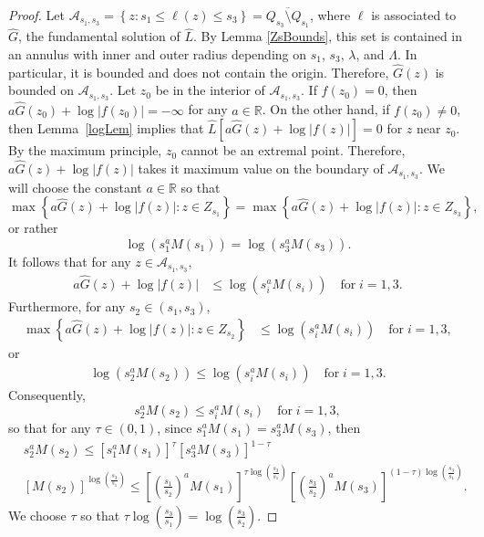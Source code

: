 \documentclass[12pt,reqno]{amsart}
\theoremstyle{plain}
\theoremstyle{definition}
\newcommand{\la}{\lambda}
\newcommand{\La}{\Lambda}
\newcommand{\abs}[1]{\left\vert#1\right\vert}
\newcommand{\set}[1]{\left\{#1\right\}}
\newcommand{\brac}[1]{\left[#1\right]}
\newcommand{\pr}[1]{\left( #1 \right) }
\newcommand{\R}{\ensuremath{\mathbb{R}}}
\begin{document}
\begin{proof}
Let $\mathcal{A}_{s_1, s_3} = \set{z : s_1 \le \ell\pr{ z} \le s_3} = \overline{ Q_{s_3} \setminus Q_{s_1}}$, where $\ell$ is associated to $\hat G$, the fundamental solution of $\hat L$.  
By Lemma \ref{ZsBounds}, this set is contained in an annulus with inner and outer radius depending on $s_1$, $s_3$, $\la$, and $\La$.
In particular, it is bounded and does not contain the origin.
Therefore, $\hat G\pr{z}$ is bounded on $\mathcal{A}_{s_1, s_3}$. 
Let $z_0$ be in the interior of $\mathcal{A}_{s_1,s_3}$. 
If $f\pr{z_0}=0$, then $a \hat G\pr{z_0}+\log\abs{f\pr{z_0}}=-\infty$ for any $a\in\R$. 
On the other hand, if $f\pr{z_0} \ne 0$, then Lemma~\ref{logLem} implies that $\hat L \brac{a \hat G\pr{z} + \log\abs{f\pr{z}}} = 0$ for $z$ near $z_0$. 
By the maximum principle, $z_0$ cannot be an extremal point. 
Therefore, $a \hat G\pr{z} + \log\abs{f\pr{z}}$ takes it maximum value on the boundary of $\mathcal{A}_{s_1, s_3}$. We will choose the constant $a\in\R$ so that 
$$\max\set{a \hat G\pr{z} + \log\abs{f\pr{z}} : z \in Z_{s_1}}  = \max\set{a \hat G\pr{z} + \log\abs{f\pr{z}} : z \in  Z_{s_3}},$$
or rather
$$\log \pr{s_1^a M\pr{s_1}}  = \log\pr{s_3^a M\pr{s_3}}.$$
It follows that for any $z \in \mathcal{A}_{s_1, s_3}$,
\begin{align*}
a \hat G\pr{z} + \log\abs{f\pr{z}} 
&\le\log \pr{s_i^a M\pr{s_i}}  \quad {\mbox{for}}\; i=1,3.
\end{align*}
Furthermore, for any $s_2 \in \pr{s_1, s_3}$,
\begin{align*}
\max\set{a \hat G\pr{z} + \log\abs{f\pr{z}}: z \in Z_{s_2}} 
&\le \log \pr{s_i^a M\pr{s_i}} \quad {\mbox{for}}\; i = 1,3,
\end{align*}
or
\begin{align*}
\log \pr{s_2^a M\pr{s_2}} 
\le \log \pr{s_i^a M\pr{s_i}} \quad {\mbox{for}}\; i=1,3.
\end{align*}
Consequently,
$${s_2^a M\pr{s_2}} \le 
{s_i^a M\pr{s_i}} \quad {\mbox{for}}\;i=1,3,$$
so that for any $\tau \in \pr{0,1}$, since ${s_1^a M\pr{s_1}} = {s_3^a M\pr{s_3}}$, then
\begin{align*}
&{s_2^a M\pr{s_2}} \le  \brac{s_1^a M\pr{s_1}}^\tau \brac{s_3^a M\pr{s_3}}^{1-\tau} \\
& \brac{ M\pr{s_2}}^{\log\pr{\frac{s_3}{s_1}}} \le  \brac{\pr{\frac{s_1}{s_2}}^a M\pr{s_1}}^{\tau \log\pr{\frac{s_3}{s_1}}} \brac{\pr{\frac{s_3}{s_2}}^a M\pr{s_3}}^{\pr{1-\tau}\log\pr{\frac{s_3}{s_1}}}.
\end{align*}
We choose $\tau$ so that $\tau \log\pr{\frac{s_3}{s_1}} = \log\pr{\frac{s_3}{s_2}}$. 

\end{proof}
\end{document}
